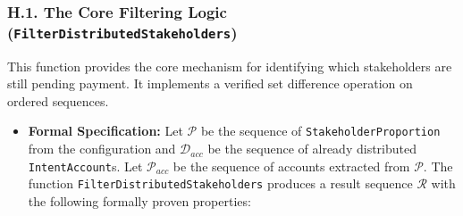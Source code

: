\documentclass[
  english,
  onecolumn]{article}
\begin{document}
\subsubsection{\texorpdfstring{H.1. The Core Filtering Logic
(\texttt{FilterDistributedStakeholders})}{H.1. The Core Filtering Logic (FilterDistributedStakeholders)}}\label{h.1.-the-core-filtering-logic-filterdistributedstakeholders}

This function provides the core mechanism for identifying which
stakeholders are still pending payment. It implements a verified set
difference operation on ordered sequences.

\begin{itemize}
\item
  \textbf{Formal Specification:} Let \(\mathcal{P}\) be the sequence of
  \texttt{StakeholderProportion} from the configuration and
  \(\mathcal{D}_{acc}\) be the sequence of already distributed
  \texttt{IntentAccount}s. Let \(\mathcal{P}_{acc}\) be the sequence of
  accounts extracted from \(\mathcal{P}\). The function
  \texttt{FilterDistributedStakeholders} produces a result sequence
  \(\mathcal{R}\) with the following formally proven properties:


\end{itemize}
\end{document}
